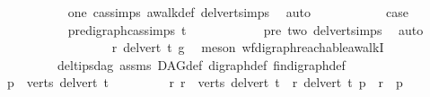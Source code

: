 \begin{isabellebody}
\ \ \ \ \ \ \ \ \ \ \isamarkupfalse%
\ one\ cas{\isachardot}{\kern0pt}simps\ awalk{\isacharunderscore}{\kern0pt}def\ del{\isacharunderscore}{\kern0pt}vert{\isacharunderscore}{\kern0pt}simps{\isacharparenleft}{\kern0pt}{}{\isacharparenright}{\kern0pt}\ \isamarkupfalse%
\ auto\isanewline
\ \ \ \ \ \ \ \ \isamarkupfalse%
\ \isamarkupfalse%
\ {\isacharquery}{\kern0pt}case\ \isanewline
\ \ \ \ \ \ \ \ \ \ \isamarkupfalse%
\ pre{\isacharunderscore}{\kern0pt}digraph{\isachardot}{\kern0pt}cas{\isachardot}{\kern0pt}simps{\isacharparenleft}{\kern0pt}{}{\isacharparenright}{\kern0pt}\ t\isanewline
\ \ \ \ \ \ \ \ \ \ \isamarkupfalse%
\ pre\ two\ del{\isacharunderscore}{\kern0pt}vert{\isacharunderscore}{\kern0pt}simps{\isacharparenleft}{\kern0pt}{}{\isacharparenright}{\kern0pt}\ \isamarkupfalse%
\ auto\isanewline
\ \ \ \ \ \ \isamarkupfalse%
\isanewline
\ \ \ \ \isamarkupfalse%
\isanewline
\ \ \ \ \isamarkupfalse%
\ \isamarkupfalse%
\ {\isachardoublequoteopen}r\ {\isasymrightarrow}\isactrlsup {\isacharasterisk}{\kern0pt}\isactrlbsub del{\isacharunderscore}{\kern0pt}vert\ t\isactrlesub \ g{\isachardoublequoteclose}\ \isamarkupfalse%
\ {\isacharparenleft}{\kern0pt}meson\ wf{\isacharunderscore}{\kern0pt}digraph{\isachardot}{\kern0pt}reachable{\isacharunderscore}{\kern0pt}awalkI\ \ \isanewline
\ \ \ \ \ \ \ \ \ \ del{\isacharunderscore}{\kern0pt}tips{\isacharunderscore}{\kern0pt}dag\ assms{\isacharparenleft}{\kern0pt}{}{\isacharparenright}{\kern0pt}\ DAG{\isacharunderscore}{\kern0pt}def\ digraph{\isacharunderscore}{\kern0pt}def\ fin{\isacharunderscore}{\kern0pt}digraph{\isacharunderscore}{\kern0pt}def{\isacharparenright}{\kern0pt}\isanewline
\ \ \isamarkupfalse%
\isanewline
\ \ \isamarkupfalse%
\ \isamarkupfalse%
\ {\isachardoublequoteopen}\ {\isasymexists}p\ {\isasymin}\ verts\ {\isacharparenleft}{\kern0pt}del{\isacharunderscore}{\kern0pt}vert\ t{\isacharparenright}{\kern0pt}\ {\isachardot}{\kern0pt}\isanewline
\ \ \ \ \ \ \ \ {\isacharparenleft}{\kern0pt}{\isasymforall}r{\isachardot}{\kern0pt}\ r\ {\isasymin}\ verts\ {\isacharparenleft}{\kern0pt}del{\isacharunderscore}{\kern0pt}vert\ t{\isacharparenright}{\kern0pt}\ {\isasymlongrightarrow}\ {\isacharparenleft}{\kern0pt}r\ {\isasymrightarrow}\isactrlsup {\isacharplus}{\kern0pt}\isactrlbsub del{\isacharunderscore}{\kern0pt}vert\ t\isactrlesub \ p\ {\isasymor}\ r\ {\isacharequal}{\kern0pt}\ p{\isacharparenright}{\kern0pt}{\isacharparenright}{\kern0pt}{\isachardoublequoteclose}\isanewline

\end{isabellebody}
